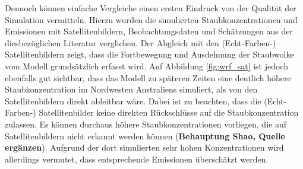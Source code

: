 \documentclass[12pt,a4paper,onecolumn]{scrartcl}
\begin{document}
Dennoch können einfache Vergleiche einen ersten Eindruck von der Qualität der Simulation vermitteln. Hierzu wurden die simulierten Staubkonzentrationen und Emissionen mit Satellitenbildern, Beobachtungsdaten und Schätzungen aus der diesbezüglichen Literatur verglichen. Der Abgleich mit den (Echt-Farben-) Satellitenbildern zeigt, dass die Fortbewegung und Ausdehnung der Staubwolke vom Modell grundsätzlich erfasst wird. Auf Abbildung \ref{fig:wrf_sat} ist jedoch ebenfalls gut sichtbar, dass das Modell zu späteren Zeiten eine deutlich höhere Staubkonzentration im Nordwesten Australiens simuliert, als von den Satellitenbildern direkt ableitbar wäre. Dabei ist zu beachten, dass die (Echt-Farben-) Satellitenbilder keine direkten Rückschlüsse auf die Staubkonzentration zulassen. Es können durchaus höhere Staubkonzentrationen vorliegen, die auf Satellitenbildern nicht erkannt werden können (\textbf{Behauptung Shao, Quelle ergänzen}). Aufgrund der dort simulierten sehr hohen Konzentrationen wird allerdings vermutet, dass entsprechende Emissionen überschätzt werden.
\end{document}
